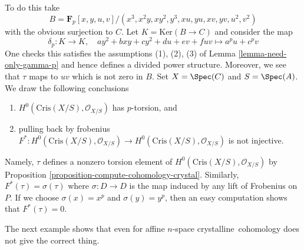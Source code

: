 \begin{example}
To do this take
$$
B = \mathbf{F}_p[x, y, u, v]/(x^3, x^2y, xy^2, y^3, xu, yu, xv, yv, u^2, v^2)
$$
with the obvious surjection to $C$. Let $K = \text{Ker}(B \to C)$ and
consider the map
$$
\delta_p : K \longrightarrow K,\quad
ay^2 + bxy + cy^2 + du + ev + fuv \longmapsto a^pu + c^pv
$$
One checks this satisfies the assumptions (1), (2), (3) of
Lemma \ref{lemma-need-only-gamma-p}
and hence defines a divided power structure. Moreover,
we see that $\tau$ maps to $uv$ which is not zero in $B$.
Set $X = \Spec(C)$ and $S = \Spec(A)$.
We draw the following conclusions
\begin{enumerate}
\item $H^0(\text{Cris}(X/S), \mathcal{O}_{X/S})$ has $p$-torsion, and
\item pulling back by frobenius $F^* : H^0(\text{Cris}(X/S), \mathcal{O}_{X/S})
\to H^0(\text{Cris}(X/S), \mathcal{O}_{X/S})$ is not injective.
\end{enumerate}
Namely, $\tau$ defines a nonzero torsion element of
$H^0(\text{Cris}(X/S), \mathcal{O}_{X/S})$ by
Proposition \ref{proposition-compute-cohomology-crystal}.
Similarly, $F^*(\tau) = \sigma(\tau)$ where $\sigma : D \to D$ is the
map induced by any lift of Frobenius on $P$. If we choose $\sigma(x) = x^p$
and $\sigma(y) = y^p$, then an easy computation shows that $F^*(\tau) = 0$.
\end{example}

\noindent
The next example shows that even for affine $n$-space crystalline\
cohomology does not give the correct thing.

